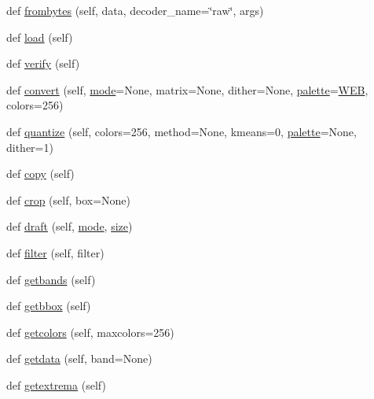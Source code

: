 \begin{DoxyCompactItemize}
\item 
def \hyperlink{classPIL_1_1Image_1_1Image_a6e29e9d9b28b90721e56a6526475a194}{frombytes} (self, data, decoder\+\_\+name=\char`\"{}raw\char`\"{}, args)
\item 
def \hyperlink{classPIL_1_1Image_1_1Image_aa2814da0ea6911910f8827202413bcc8}{load} (self)
\item 
def \hyperlink{classPIL_1_1Image_1_1Image_a1efe68d128efa7604d8972e13101461c}{verify} (self)
\item 
def \hyperlink{classPIL_1_1Image_1_1Image_a0094514054e421937b31e9039703aaff}{convert} (self, \hyperlink{classPIL_1_1Image_1_1Image_a7d372be82681ec344af8a7ba8dc84d5d}{mode}=None, matrix=None, dither=None, \hyperlink{classPIL_1_1Image_1_1Image_aed56de66e3c835733d852bb93673c1ab}{palette}=\hyperlink{namespacePIL_1_1Image_ac8a45c0e04c437394a776b8ade4c0912}{W\+EB}, colors=256)
\item 
def \hyperlink{classPIL_1_1Image_1_1Image_a3eabb1df6adc8a8c89a4bc1f0ae784e7}{quantize} (self, colors=256, method=None, kmeans=0, \hyperlink{classPIL_1_1Image_1_1Image_aed56de66e3c835733d852bb93673c1ab}{palette}=None, dither=1)
\item 
def \hyperlink{classPIL_1_1Image_1_1Image_acb0efebbea61d4b249451fbd4537b029}{copy} (self)
\item 
def \hyperlink{classPIL_1_1Image_1_1Image_aa62a2de91c9b9bd1194dd0d0f4f759cb}{crop} (self, box=None)
\item 
def \hyperlink{classPIL_1_1Image_1_1Image_ac6f0064e4cfca9baceaba8198856c1e3}{draft} (self, \hyperlink{classPIL_1_1Image_1_1Image_a7d372be82681ec344af8a7ba8dc84d5d}{mode}, \hyperlink{classPIL_1_1Image_1_1Image_ae9939a80d0ea9392d8db8556353b2585}{size})
\item 
def \hyperlink{classPIL_1_1Image_1_1Image_a0a180c133e6c5d5a0fd5fe0942bfb366}{filter} (self, filter)
\item 
def \hyperlink{classPIL_1_1Image_1_1Image_aa0a9151b9412ac2b662e40369b88a6b3}{getbands} (self)
\item 
def \hyperlink{classPIL_1_1Image_1_1Image_ae7fcd05b874e605660cc933679b552c0}{getbbox} (self)
\item 
def \hyperlink{classPIL_1_1Image_1_1Image_a99e9c0211334cc10130a653a10e1069c}{getcolors} (self, maxcolors=256)
\item 
def \hyperlink{classPIL_1_1Image_1_1Image_aa9e08aac67e35f75aa45c8ff17d1988a}{getdata} (self, band=None)
\item 
def \hyperlink{classPIL_1_1Image_1_1Image_ab5b97c380d1d058084386c1ffc2f095a}{getextrema} (self)

\end{DoxyCompactItemize}
